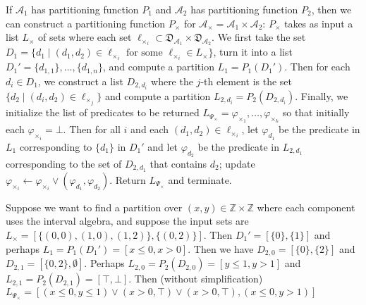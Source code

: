 If $\mathcal{A}_1$ has partitioning function $P_1$
and $\mathcal{A}_2$ has partitioning function $P_2$,
then we can construct a partitioning function $P_\times$
for $\mathcal{A}_\times = \mathcal{A}_1 \times \mathcal{A}_2$:
$P_\times$ takes as input a list $L_\times$ of sets
where each set $\ell_{\times_i} \subset \mathfrak{D}_{\mathcal{A}_1} \times \mathfrak{D}_{\mathcal{A}_2}$.
%
We first take the set $D_1 = \{d_1 \mid (d_1, d_2) \in \ell_{\times_i}
\text{ for some } \ell_{\times_i} \in L_\times \}$,
turn it into a list $D_1' = \{d_{1,1}\},\ldots,\{d_{1,n}\}$,
and compute a partition $L_1 = P_1(D_1')$.
Then for each $d_i \in D_1$, we construct a list
$D_{2,d_i}$ where the $j$-th element is the set
$\{d_2 \mid (d_i, d_2) \in \ell_{\times_j}\}$
and compute a partition $L_{2,d_i} = P_2(D_{2,d_i})$.
%
Finally, we initialize the list of predicates to be returned
$L_{\Psi_\times} = \varphi_{\times_1}, \ldots, \varphi_{\times_k}$
so that initially each $\varphi_{\times_i} = \bot$.
Then for all $i$ and each $(d_1, d_2) \in \ell_{\times_i}$,
let $\varphi_{d_1}$ be the predicate in $L_1$ corresponding to
$\{d_1\}$ in $D_1'$
and let $\varphi_{d_2}$ be the predicate in $L_{2,d_1}$
corresponding to the set of $D_{2,d_1}$ that contains $d_2$;
update $\varphi_{\times_i} \gets \varphi_{\times_i} \vee (\varphi_{d_1}, \varphi_{d_2})$.
%
Return $L_{\Psi_\times}$ and terminate.

\begin{example}
    Suppose we want to find a partition over $(x,y) \in \mathbb{Z} \times \mathbb{Z}$
    where each component uses the interval algebra,
    and suppose the input sets are
    $L_\times = [\{(0, 0), (1, 0), (1,2)\}, \{(0,2)\}]$.
    Then $D_1' = [\{0\}, \{1\}]$
    and perhaps $L_1 = P_1(D_1') = [x \leq 0, x > 0]$.
    Then we have
    $D_{2,0} = [\{0\}, \{2\}]$ and
    $D_{2,1} = [\{0,2\}, \emptyset]$.
    Perhaps
    $L_{2,0} = P_2(D_{2,0}) = [y \leq 1, y > 1]$ and
    $L_{2,1} = P_2(D_{2,1}) = [\top, \bot]$.
    Then (without simplification)
    $L_{\Psi_\times} = [(x \leq 0, y \leq 1) \vee (x > 0, \top) \vee (x > 0, \top), (x \leq 0, y > 1)]$
\end{example}

